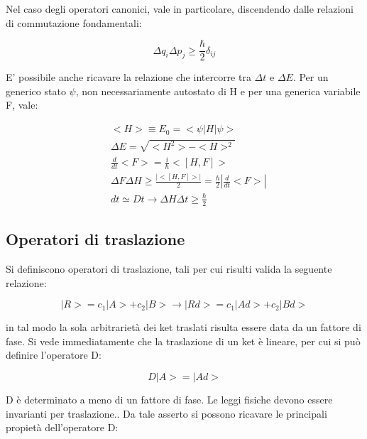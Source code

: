 \documentclass{article}
\begin{document}
Nel caso degli operatori canonici, vale in particolare, discendendo dalle relazioni di commutazione fondamentali:

\begin{equation}
    \Delta q_i \Delta p_j\geq \frac{\hbar}{2}\delta_{ij}
\end{equation}

E' possibile anche ricavare la relazione che intercorre tra $\Delta t$ e $\Delta E$.
Per un generico stato $\psi$, non necessariamente autostato di H e per una generica variabile F, vale:

\begin{equation}
    \begin{aligned}
         & <H>\equiv E_0= <\psi|H|\psi>                                               \\
         & \Delta E=\sqrt{<H^2>-<H>^2}                                                \\
         & \frac{d}{dt}<F>=\frac{i}{\hbar}<[H,F]>                                     \\
         & \Delta F\Delta H \geq \frac{|<[H,F]>|}{2}=\frac{\hbar}{2}|\frac{d}{dt}<F>| \\
         & dt \simeq Dt \rightarrow \Delta H\Delta t \geq \frac{\hbar}{2}
    \end{aligned}
\end{equation}




\subsection{Operatori di traslazione}
Si definiscono operatori di traslazione, tali per cui risulti valida la seguente relazione:

\begin{equation}
    |R>=c_1|A>+c_2|B> \rightarrow |Rd>=c_1|Ad>+c_2|Bd>
\end{equation}

in tal modo la sola arbitrarietà dei ket traslati risulta essere data da un fattore di fase.
Si vede immediatamente che la traslazione di un ket è lineare, per cui si può definire l'operatore D:

\begin{equation}
    D|A>=|Ad>
\end{equation}

D è determinato a meno di un fattore di fase.
Le leggi fisiche devono essere invarianti per traslazione..
Da tale asserto si possono ricavare le principali propietà dell'operatore D:
\end{document}

